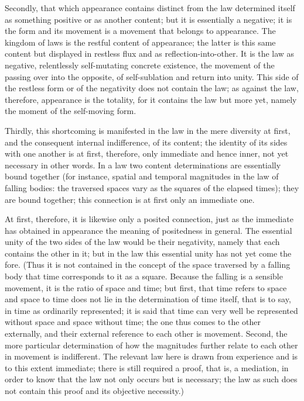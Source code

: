 Secondly, that which appearance contains
distinct from the law determined itself as
something positive or as another content;
but it is essentially a negative;
it is the form and its movement is
a movement that belongs to appearance.
The kingdom of laws is
the restful content of appearance;
the latter is this same content
but displayed in restless flux
and as reflection-into-other.
It is the law as negative,
relentlessly self-mutating concrete existence,
the movement of the passing over into the opposite,
of self-sublation and return into unity.
This side of the restless form
or of the negativity
does not contain the law;
as against the law, therefore,
appearance is the totality,
for it contains the law but more yet,
namely the moment of the self-moving form.

Thirdly, this shortcoming is manifested
in the law in the mere diversity at first,
and the consequent internal indifference, of its content;
the identity of its sides with one another
is at first, therefore,
only immediate and hence inner,
not yet necessary in other words.
In a law two content determinations are
essentially bound together
(for instance, spatial and temporal magnitudes
in the law of falling bodies:
the traversed spaces vary as
the squares of the elapsed times);
they are bound together;
this connection is at first
only an immediate one.

At first, therefore, it is likewise only a posited connection,
just as the immediate has obtained in appearance
the meaning of positedness in general.
The essential unity of the two sides
of the law would be their negativity,
namely that each contains the other in it;
but in the law this essential unity has not yet come the fore.
(Thus it is not contained in the concept of
the space traversed by a falling body
that time corresponds to it as a square.
Because the falling is a sensible movement,
it is the ratio of space and time;
but first, that time refers to space and space to time
does not lie in the determination of time itself,
that is to say, in time as ordinarily represented;
it is said that time can very well be represented
without space and space without time;
the one thus comes to the other externally,
and their external reference to each other is movement.
Second, the more particular determination of
how the magnitudes further relate to
each other in movement is indifferent.
The relevant law here is drawn from experience
and is to this extent immediate;
there is still required a proof,
that is, a mediation,
in order to know that the law
not only occurs but is necessary;
the law as such does not contain
this proof and its objective necessity.)

